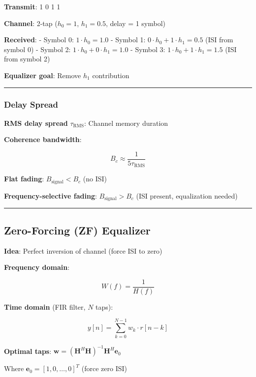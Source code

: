 \textbf{Transmit}: 1 0 1 1

\textbf{Channel}: 2-tap (\(h_0 = 1\), \(h_1 = 0.5\), delay = 1 symbol)

\textbf{Received}: - Symbol 0: \(1 \cdot h_0 = 1.0\) - Symbol 1:
\(0 \cdot h_0 + 1 \cdot h_1 = 0.5\) (ISI from symbol 0) - Symbol 2:
\(1 \cdot h_0 + 0 \cdot h_1 = 1.0\) - Symbol 3:
\(1 \cdot h_0 + 1 \cdot h_1 = 1.5\) (ISI from symbol 2)

\textbf{Equalizer goal}: Remove \(h_1\) contribution

\begin{center}\rule{0.5\linewidth}{0.5pt}\end{center}

\subsubsection{Delay Spread}\label{delay-spread}

\textbf{RMS delay spread} \(\tau_{\text{RMS}}\): Channel memory duration

\textbf{Coherence bandwidth}:

\[
B_c \approx \frac{1}{5 \tau_{\text{RMS}}}
\]

\textbf{Flat fading}: \(B_{\text{signal}} < B_c\) (no ISI)

\textbf{Frequency-selective fading}: \(B_{\text{signal}} > B_c\) (ISI
present, equalization needed)

\begin{center}\rule{0.5\linewidth}{0.5pt}\end{center}

\subsection{Zero-Forcing (ZF)
Equalizer}\label{zero-forcing-zf-equalizer}

\textbf{Idea}: Perfect inversion of channel (force ISI to zero)

\textbf{Frequency domain}:

\[
W(f) = \frac{1}{H(f)}
\]

\textbf{Time domain} (FIR filter, \(N\) taps):

\[
y[n] = \sum_{k=0}^{N-1} w_k \cdot r[n-k]
\]

\textbf{Optimal taps}:
\(\mathbf{w} = (\mathbf{H}^H \mathbf{H})^{-1} \mathbf{H}^H \mathbf{e}_0\)

Where \(\mathbf{e}_0 = [1, 0, \ldots, 0]^T\) (force zero ISI)

